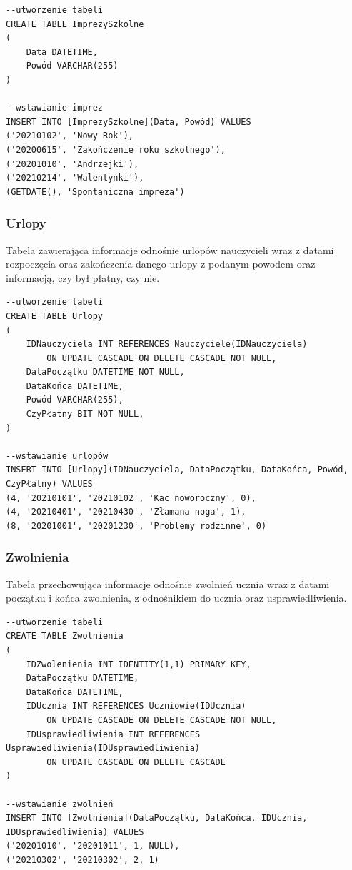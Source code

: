 \documentclass[60pt]{article}
\begin{document}
\begin{verbatim}
--utworzenie tabeli
CREATE TABLE ImprezySzkolne
(
	Data DATETIME,
	Powód VARCHAR(255)
)

--wstawianie imprez
INSERT INTO [ImprezySzkolne](Data, Powód) VALUES
('20210102', 'Nowy Rok'),
('20200615', 'Zakończenie roku szkolnego'),
('20201010', 'Andrzejki'),
('20210214', 'Walentynki'),
(GETDATE(), 'Spontaniczna impreza')
\end{verbatim}

 \subsubsection{Urlopy}
Tabela zawierająca informacje odnośnie urlopów nauczycieli wraz z datami rozpoczęcia oraz zakończenia danego urlopy z podanym powodem oraz informacją, czy był płatny, czy nie.

\begin{verbatim}
--utworzenie tabeli
CREATE TABLE Urlopy
(
    IDNauczyciela INT REFERENCES Nauczyciele(IDNauczyciela) 
        ON UPDATE CASCADE ON DELETE CASCADE NOT NULL,
    DataPoczątku DATETIME NOT NULL,
    DataKońca DATETIME,
    Powód VARCHAR(255),
    CzyPłatny BIT NOT NULL,
)

--wstawianie urlopów
INSERT INTO [Urlopy](IDNauczyciela, DataPoczątku, DataKońca, Powód, CzyPłatny) VALUES
(4, '20210101', '20210102', 'Kac noworoczny', 0),
(4, '20210401', '20210430', 'Złamana noga', 1),
(8, '20201001', '20201230', 'Problemy rodzinne', 0)
\end{verbatim}

 \subsubsection{Zwolnienia}
Tabela przechowująca informacje odnośnie zwolnień ucznia wraz z datami początku i końca zwolnienia, z odnośnikiem do ucznia oraz usprawiedliwienia.

\begin{verbatim}
--utworzenie tabeli
CREATE TABLE Zwolnienia
(
    IDZwolenienia INT IDENTITY(1,1) PRIMARY KEY,
    DataPoczątku DATETIME,
    DataKońca DATETIME,
    IDUcznia INT REFERENCES Uczniowie(IDUcznia)
        ON UPDATE CASCADE ON DELETE CASCADE NOT NULL,
    IDUsprawiedliwienia INT REFERENCES Usprawiedliwienia(IDUsprawiedliwienia)
        ON UPDATE CASCADE ON DELETE CASCADE
)

--wstawianie zwolnień
INSERT INTO [Zwolnienia](DataPoczątku, DataKońca, IDUcznia, IDUsprawiedliwienia) VALUES
('20201010', '20201011', 1, NULL),
('20210302', '20210302', 2, 1)
\end{verbatim}
\end{document}
